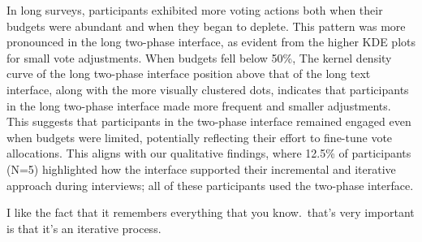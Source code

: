 In long surveys, participants exhibited more voting actions both when their budgets were abundant and when they began to deplete. This pattern was more pronounced in the long two-phase interface, as evident from the higher KDE plots for small vote adjustments. When budgets fell below 50\%, The kernel density curve of the long two-phase interface position above that of the long text interface, along with the more visually clustered dots, indicates that participants in the long two-phase interface made more frequent and smaller adjustments. This suggests that participants in the two-phase interface remained engaged even when budgets were limited, potentially reflecting their effort to fine-tune vote allocations. This aligns with our qualitative findings, where 12.5\% of participants (N=5) highlighted how the interface supported their incremental and iterative approach during interviews; all of these participants used the two-phase interface.

\begin{displayquote}
I like the fact that it remembers everything that you know.~\bracketellipsis that's very important is that it's an iterative process.\hfill{}
\end{displayquote}






